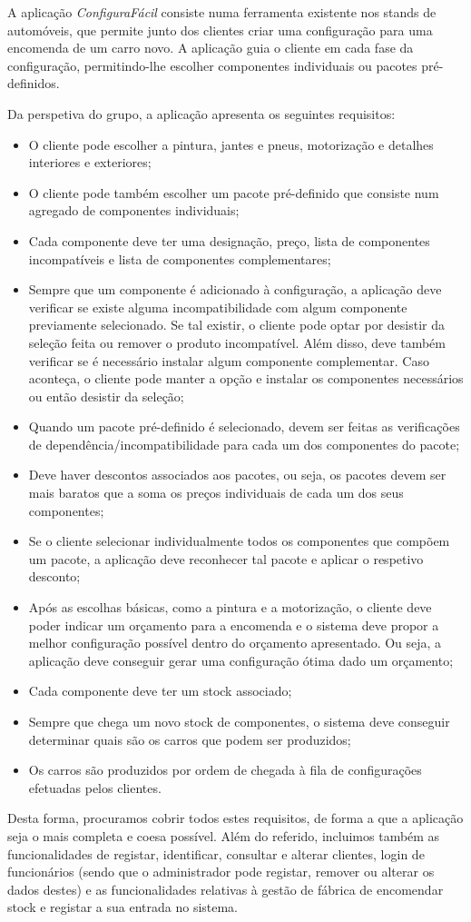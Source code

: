 \documentclass[11pt]{article} %
\begin{document}
A aplicação \textit{ConfiguraFácil} consiste numa ferramenta existente nos stands de automóveis, que permite junto dos clientes criar uma configuração para uma encomenda de um carro novo. A aplicação guia o cliente em cada fase da configuração, permitindo-lhe escolher componentes individuais ou pacotes pré-definidos. 

Da perspetiva do grupo, a aplicação apresenta os seguintes requisitos:
\begin{itemize}
	\item O cliente pode escolher a pintura, jantes e pneus, motorização e detalhes interiores e exteriores;
	\item O cliente pode também escolher um pacote pré-definido que consiste num agregado de componentes individuais;
	\item Cada componente deve ter uma designação, preço, lista de componentes incompatíveis e lista de componentes complementares;
	\item Sempre que um componente é adicionado à configuração, a aplicação deve verificar se existe alguma incompatibilidade com algum componente previamente selecionado. Se tal existir, o cliente pode optar por desistir da seleção feita ou remover o produto incompatível. Além disso, deve também verificar se é necessário instalar algum componente complementar. Caso aconteça, o cliente pode manter a opção e instalar os componentes necessários ou então desistir da seleção;
	\item Quando um pacote pré-definido é selecionado, devem ser feitas as verificações de dependência/incompatibilidade para cada um dos componentes do pacote;
	\item Deve haver descontos associados aos pacotes, ou seja, os pacotes devem ser mais baratos que a soma os preços individuais de cada um dos seus componentes;
	\item Se o cliente selecionar individualmente todos os componentes que compõem um pacote, a aplicação deve reconhecer tal pacote e aplicar o respetivo desconto;
	\item Após as escolhas básicas, como a pintura e a motorização, o cliente deve poder indicar um orçamento para a encomenda e o sistema deve propor a melhor configuração possível dentro do orçamento apresentado. Ou seja, a aplicação deve conseguir gerar uma configuração ótima dado um orçamento;
	\item Cada componente deve ter um stock associado;
	\item Sempre que chega um novo stock de componentes, o sistema deve conseguir determinar quais são os carros que podem ser produzidos;
	\item Os carros são produzidos por ordem de chegada à fila de configurações efetuadas pelos clientes.
\end{itemize}
Desta forma, procuramos cobrir todos estes requisitos, de forma a que a aplicação seja o mais completa e coesa possível. Além do referido, incluimos também as funcionalidades de registar, identificar, consultar e alterar clientes, login de funcionários (sendo que o administrador pode registar, remover ou alterar os dados destes) e as funcionalidades relativas à gestão de fábrica de encomendar stock e registar a sua entrada no sistema.
\end{document}

